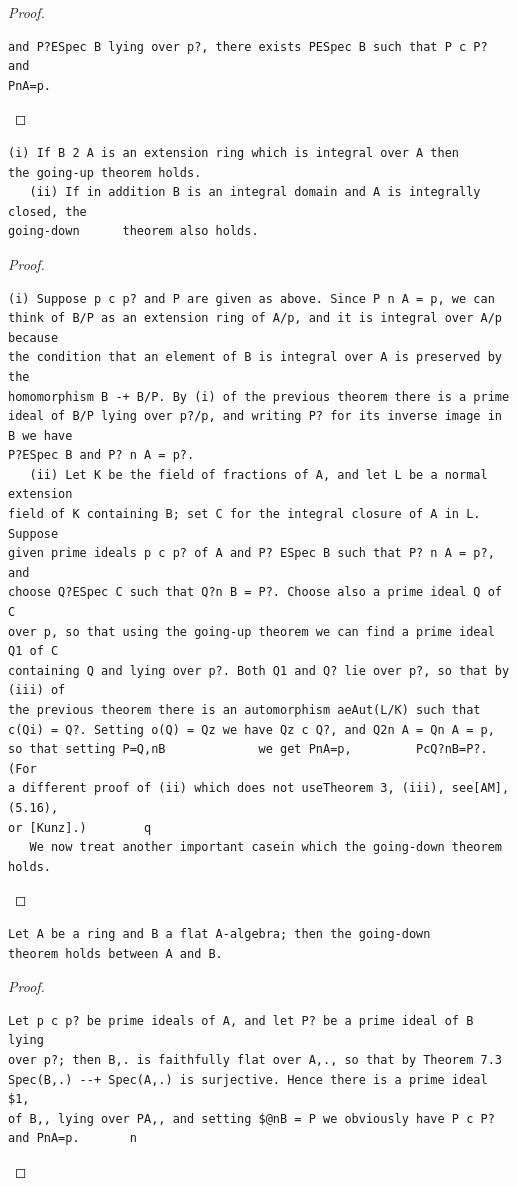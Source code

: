 \begin{proof}
\begin{verbatim}
and P?ESpec B lying over p?, there exists PESpec B such that P c P? and
PnA=p.
\end{verbatim}
\end{proof}


\begin{theorem}\label{mcrt-auto-theorem-9-4}\uses{}
\begin{verbatim}
(i) If B 2 A is an extension ring which is integral over A then
the going-up theorem holds.
   (ii) If in addition B is an integral domain and A is integrally closed, the
going-down      theorem also holds.
\end{verbatim}
\end{theorem}
\begin{proof}
\begin{verbatim}
(i) Suppose p c p? and P are given as above. Since P n A = p, we can
think of B/P as an extension ring of A/p, and it is integral over A/p because
the condition that an element of B is integral over A is preserved by the
homomorphism B -+ B/P. By (i) of the previous theorem there is a prime
ideal of B/P lying over p?/p, and writing P? for its inverse image in B we have
P?ESpec B and P? n A = p?.
   (ii) Let K be the field of fractions of A, and let L be a normal extension
field of K containing B; set C for the integral closure of A in L. Suppose
given prime ideals p c p? of A and P? ESpec B such that P? n A = p?, and
choose Q?ESpec C such that Q?n B = P?. Choose also a prime ideal Q of C
over p, so that using the going-up theorem we can find a prime ideal Q1 of C
containing Q and lying over p?. Both Q1 and Q? lie over p?, so that by (iii) of
the previous theorem there is an automorphism aeAut(L/K) such that
c(Qi) = Q?. Setting o(Q) = Qz we have Qz c Q?, and Q2n A = Qn A = p,
so that setting P=Q,nB             we get PnA=p,         PcQ?nB=P?.        (For
a different proof of (ii) which does not useTheorem 3, (iii), see[AM], (5.16),
or [Kunz].)        q
   We now treat another important casein which the going-down theorem
holds.
\end{verbatim}
\end{proof}


\begin{theorem}\label{mcrt-auto-theorem-9-5}\uses{}
\begin{verbatim}
Let A be a ring and B a flat A-algebra; then the going-down
theorem holds between A and B.
\end{verbatim}
\end{theorem}
\begin{proof}
\begin{verbatim}
Let p c p? be prime ideals of A, and let P? be a prime ideal of B lying
over p?; then B,. is faithfully flat over A,., so that by Theorem 7.3
Spec(B,.) --+ Spec(A,.) is surjective. Hence there is a prime ideal $1,
of B,, lying over PA,, and setting $@nB = P we obviously have P c P?
and PnA=p.       n
\end{verbatim}
\end{proof}


